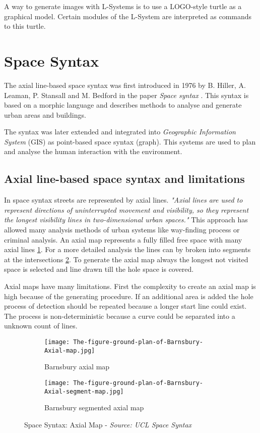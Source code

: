 A way to generate images with L-Systems is to use a LOGO-style turtle as a graphical model. Certain modules of the L-System are interpreted as commands to this turtle.

\pagebreak
\section{Space Syntax} \label{sec:space_syntax}
The axial line-based space syntax was first introduced in 1976 by B. Hiller, A. Leaman, P. Stansall and M. Bedford in the paper \textit{Space syntax} \citep{spaceSyntax:1976}. This syntax is based on a morphic language and describes methods to analyse and generate urban areas and buildings.

The syntax was later extended and integrated into \textit{Geographic Information System} (GIS) as point-based space syntax (graph). This systems are used to plan and analyse the human interaction with the environment.

\subsection{Axial line-based space syntax and limitations}
In space syntax streets are represented by axial lines. 
\textit{"Axial lines are used to represent directions of uninterrupted movement and visibility, so they represent the longest visibility lines in two-dimensional urban spaces."} \citep{integrationSpaceSyntaxGIS:2002}
This approach has allowed many analysis methods of urban systems like way-finding process or criminal analysis. An axial map represents a fully filled free space with many axial lines \ref{fig:barnsbury_axial_map}. For a more detailed analysis the lines can by broken into segments at the intersections \ref{fig:barnsbury_segmented_axial_map}. To generate the axial map always the longest not visited space is selected and line drawn till the hole space is covered.

Axial maps have many limitations. First the complexity to create an axial map is high because of the generating procedure. If an additional area is added the hole process of detection should be repeated because a longer start line could exist. The process is non-deterministic because a curve could be separated into a unknown count of lines.

\begin{figure}[ht]
    \centering
    \begin{subfigure}[b]{0.4\textwidth}
        \texttt{[image: The-figure-ground-plan-of-Barnsbury-Axial-map.jpg]}
        \caption{Barnsbury axial map}
        \label{fig:barnsbury_axial_map}
    \end{subfigure}
    \quad
    \begin{subfigure}[b]{0.4\textwidth}
        \texttt{[image: The-figure-ground-plan-of-Barnsbury-Axial-segment-map.jpg]}
        \caption{Barnsbury segmented axial map}
        \label{fig:barnsbury_segmented_axial_map}
    \end{subfigure}
    \caption{Space Syntax: Axial Map - \textit{Source: UCL Space Syntax \citep{SpaceSyntaxExampels}}}
    \label{fig:SpaceSyntaxAxialMap}
\end{figure}

